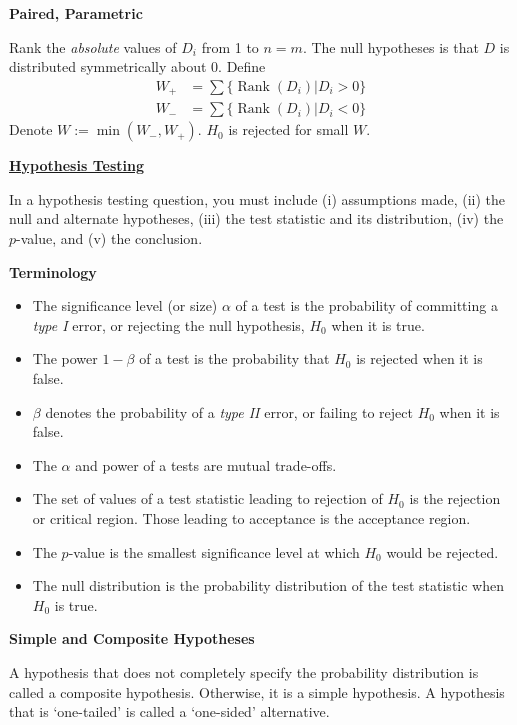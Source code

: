 \documentclass[a4paper]{article}
\newcommand{\heading}[1]{{\small\underline{\textbf{#1}}}\smallskip}
\newcommand{\subheading}[1]{{\scriptsize\textbf{#1}}}
\renewenvironment{section}[1]
  {
    \subheading{#1}

  }{
    \smallskip
  }
\DeclareMathOperator{\Rank}{Rank}
\begin{document}
\begin{multicols*}{4}
\begin{section}{Paired, Parametric}
  Rank the \textit{absolute} values of $D_i$ from 1 to $n=m$. The null
  hypotheses is that $D$ is distributed symmetrically about 0. Define
  \begin{align*}
    W_+ &= \sum \{\Rank(D_i) | D_i > 0 \} \\
    W_- &= \sum \{\Rank(D_i) | D_i < 0 \}
  \end{align*}
  Denote $W := \min(W_-, W_+)$. $H_0$ is rejected for small $W$.
\end{section}

\heading{Hypothesis Testing}

In a hypothesis testing question, you must include (i) assumptions made, (ii)
the null and alternate hypotheses, (iii) the test statistic and its
distribution, (iv) the $p$-value, and (v) the conclusion. \smallskip

\begin{section}{Terminology}
  \begin{itemize}
    \item The significance level (or size) $\alpha$ of a test is the probability
      of committing a \textit{type I} error, or rejecting the null hypothesis,
      $H_0$ when it is true.
    \item The power $1-\beta$ of a test is the probability that $H_0$ is
      rejected when it is false.
    \item $\beta$ denotes the probability of a \textit{type II} error, or
      failing to reject $H_0$ when it is false.
    \item The $\alpha$ and power of a tests are mutual trade-offs.
    \item The set of values of a test statistic leading to rejection of $H_0$ is
      the rejection or critical region. Those leading to acceptance is the
      acceptance region.
    \item The $p$-value is the smallest significance level at which $H_0$ would
      be rejected.
    \item The null distribution is the probability distribution of the test
      statistic when $H_0$ is true.
  \end{itemize}
\end{section}

\begin{section}{Simple and Composite Hypotheses}
  A hypothesis that does not completely specify the probability distribution is
  called a composite hypothesis. Otherwise, it is a simple hypothesis. A
  hypothesis that is `one-tailed' is called a `one-sided' alternative.
\end{section}


\end{multicols*}
\end{document}
